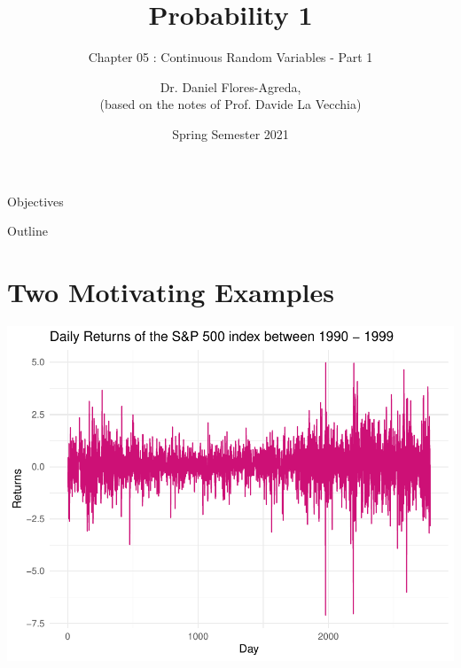 \documentclass[notes=show,smaller,handout]{beamer}\usepackage[]{graphicx}\usepackage[]{color}
\newenvironment{knitrout}{}{} %
\begin{document}
\title[S110015]{Probability 1}
\subtitle{Chapter 05 : Continuous Random Variables - Part 1}
\author[Flores-Agreda, La Vecchia]{Dr. Daniel Flores-Agreda, \\[0.5em] \tiny{(based on the notes of Prof. Davide La Vecchia)}}
\date{Spring Semester 2021}

\begin{frame}
\titlepage
\end{frame}


\begin{frame}{Objectives}

\end{frame}

\begin{frame}{Outline}
\tableofcontents
\end{frame}

\section{Two Motivating Examples}



\begin{frame}{\secname}
  \begin{example}
\begin{knitrout}
\color{fgcolor}

{\centering \includegraphics[width=0.5\linewidth]{figure/unnamed-chunk-2-1} 

}



\end{knitrout}
  \end{example}
\end{frame}
\end{document}
